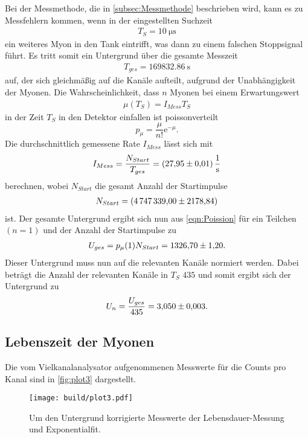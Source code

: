 Bei der Messmethode, die in \autoref{subsec:Messmethode} beschrieben wird, kann es zu Messfehlern kommen, wenn in der eingestellten Suchzeit
\begin{align}
  T_S = \qty{10}{\micro\second}
  \label{eqn:Suchzeit}
\end{align}
ein weiteres Myon in den Tank eintrifft, was dann zu einem falschen Stoppsignal führt. 
Es tritt somit ein Untergrund über die gesamte Messzeit
\begin{align}
  T_{ges} = \qty{169832.86}{\second}
  \label{eqn:Messzeit}
\end{align}
auf, der sich gleichmäßig auf die Kanäle aufteilt, aufgrund der Unabhängigkeit der Myonen.
Die Wahrscheinlichkeit, dass $n$ Myonen bei einem Erwartungswert
\begin{align*}
  \mu(T_S) = I_{Mess} T_S
  \label{eqn:Erwartungswert}
\end{align*}
in der Zeit $T_S$ in den Detektor einfallen ist poissonverteilt
\begin{equation}
  p_{\mu} = \frac{\mu}{n!} \text{e}^{-\mu}.\label{eqn:Poission}
\end{equation}
Die durchschnittlich gemessene Rate $I_{Mess}$ lässt sich mit
\begin{align*}
  I_{Mess} = \frac{N_{Start}}{T_{ges}} = \qty{27.95 \pm 0.01}{\second\tothe{-1}}
\end{align*}
berechnen, wobei $N_{Start}$ die gesamt Anzahl der Startimpulse 
\begin{align*}
  N_{Start} = \qty{4747339 \pm 2178.84}{} 
\end{align*}
ist.
Der gesamte Untergrund ergibt sich nun aus \autoref{eqn:Poission} für ein Teilchen $(n=1)$ und der Anzahl der Startimpulse zu
\begin{align}
  U_{ges} = p_{\mu}(1) N_{Start} = \num{1326.70 \pm 1.20}.
\end{align}
Dieser Untergrund muss nun auf die relevanten Kanäle normiert werden. Dabei beträgt die Anzahl der relevanten Kanäle in $T_S$ $435$ und somit ergibt sich der Untergrund zu
\begin{align}
  U_n = \frac{U_{ges}}{435} = \num{3.050 \pm 0.003}.
\end{align}

\subsection{Lebenszeit der Myonen}
\label{subsec:Lebenszeit}
Die vom Vielkanalanalysator aufgenommenen Messwerte für die Counts pro Kanal sind in \autoref{fig:plot3} dargestellt.
\begin{figure}[H]
  \centering
  \texttt{[image: build/plot3.pdf]}
  \caption {Um den Untergrund korrigierte Messwerte der Lebensdauer-Messung und Exponentialfit.}
  \label{fig:plot3}
\end{figure}

